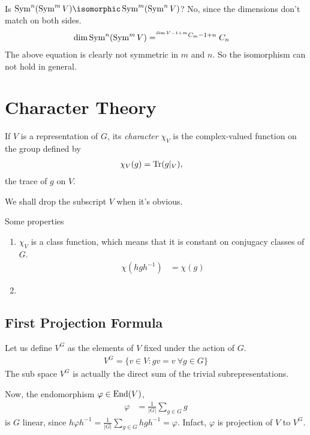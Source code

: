 \noindent{}\\
 Is $\Sym^n(\Sym^mV)\isomorphic \Sym^m(\Sym^n V)$? No, since the dimensions don't match on both sides.
\begin{align}
    \dim \operatorname{Sym}^n(\operatorname{Sym}^mV) &= ^{{}^{\dim V - 1 + m}C_{m} -1 +n}C_{n}
\end{align}
The above equation is clearly not symmetric in $m$ and $n$. So the isomorphism can not hold in general.


\chapter{Character Theory}
\label{cha:character_theory}
\begin{definition}
    If $V$ is a representation of $G$, its \emph{character} $\chi_V$ is the complex-valued function on the group defined by
    \begin{align}
        \chi_V(g) &= \operatorname{Tr}(g|_V),
    \end{align}
    the trace of $g$ on $V$.
\end{definition}

We shall drop the subscript $V$ when it's obvious.

Some properties
\begin{enumerate}
    \item $\chi_V$ is a class function, which means that it is constant on conjugacy classes  of $G$.
        \begin{align}
            \chi(hgh^{-1}) &= \chi(g)
        \end{align}
    \item 
\end{enumerate}

\section{First Projection Formula}
\label{sec:first_projection_formula}
Let us define $V^G$ as the elements of $V$ fixed under the action of $G$.
\begin{align}
    V^G=\{v\in V: gv=v\ \forall g\in G \}
\end{align}
The sub space $V^G$ is actually the direct sum of the trivial subrepresentations.

Now, the endomorphism $\varphi \in \operatorname{End}(V)$, 
\begin{align}
    \varphi &= \frac{1}{|G|} \sum_{g\in G} g
\end{align}
is $G$ linear, since $h\varphi h^{-1} = \frac{1}{|G|}\sum_{g\in G} hgh^{-1} = \varphi$.  Infact, $\varphi$ is projection of $V$ to $V^G$.

